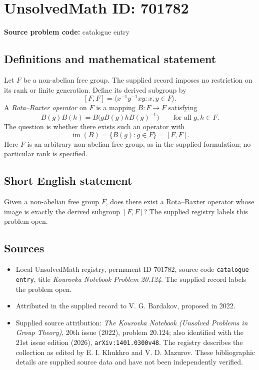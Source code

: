 \documentclass[11pt]{article}
\begin{document}
\section*{UnsolvedMath ID: 701782}
\textbf{Source problem code:} catalogue entry
\subsection{Definitions and mathematical statement}
Let \(F\) be a non-abelian free group. The supplied record imposes no restriction on its rank or finite generation. Define its derived subgroup by
\[
[F,F]=\bigl\langle x^{-1}y^{-1}xy : x,y\in F\bigr\rangle.
\]
A \emph{Rota--Baxter operator} on \(F\) is a mapping \(B:F\to F\) satisfying
\[
B(g)B(h)=B\bigl(gB(g)hB(g)^{-1}\bigr)
\qquad\text{for all }g,h\in F.
\]
The question is whether there exists such an operator with
\[
\operatorname{im}(B)=\{B(g):g\in F\}=[F,F].
\]
Here \(F\) is an arbitrary non-abelian free group, as in the supplied formulation; no particular rank is specified.
\subsection{Short English statement}
Given a non-abelian free group \(F\), does there exist a Rota--Baxter operator whose image is exactly the derived subgroup \([F,F]\)? The supplied registry labels this problem open.
\subsection{Sources}
\begin{itemize}
\item Local UnsolvedMath registry, permanent ID \(701782\), source code \texttt{catalogue entry}, title \emph{Kourovka Notebook Problem 20.124}. The supplied record labels the problem open.
\item Attributed in the supplied record to V. G. Bardakov, proposed in 2022.
\item Supplied source attribution: \emph{The Kourovka Notebook (Unsolved Problems in Group Theory)}, 20th issue (2022), problem 20.124; also identified with the 21st issue edition (2026), \texttt{arXiv:1401.0300v48}. The registry describes the collection as edited by E. I. Khukhro and V. D. Mazurov. These bibliographic details are supplied source data and have not been independently verified.
\end{itemize}
\end{document}

